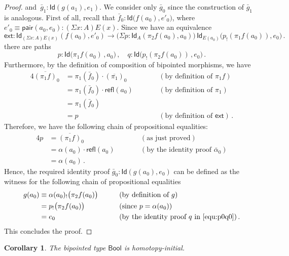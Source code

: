 \documentclass[reqno,10pt,a4paper,oneside]{amsart}
\numberwithin{equation}{section}
\theoremstyle{mythm}
\newtheorem{corollary}[theorem]{Corollary}
\theoremstyle{mydef}
\theoremstyle{myrmk}
\newcommand{\deq}{\equiv}
\newcommand{\peq}{=}
\newcommand{\co}{\colon}
\newcommand{\ext}{\mathsf{ext}}
\newcommand{\ct}{\cdot}
\newcommand{\pair}{\mathsf{pair}}
\newcommand{\Id}{\mathsf{Id}}
\newcommand{\refl}{\mathsf{refl}}
\newcommand{\Bool}{\mathsf{Bool}}
\begin{document}
\begin{proof}
and~$\bar{g}_1 \co \Id( g(a_1), e_1)$. We consider only $\bar{g}_0$ since the construction of $\bar{g}_1$ is  analogous. First of all, recall that 
$\bar{f}_0 \co \Id \big( f(a_0),  e'_0\big)$, where $e'_0 \equiv \pair(a_0, e_0) \co (\Sigma x :A ) E(x)$. Since we have an equivalence
\[
\ext \co \Id_{(\Sigma x : A) E(x)}( f(a_0), e'_0) \to \big( \Sigma p \co \Id_A( \pi_2 f(a_0), a_0) \big) \, \Id_{E(a_0)} \big( p_{!}( \pi_1 f(a_0)) , e_0 \big) \, .
\]
there are paths 
\begin{equation}
\label{equ:p0q0}
p \co \Id \big( \pi_1 f (a_0) \, , a_0 \big) \, , \quad q \co \Id \big( p_{!}( \pi_2 f (a_0)) \, , e_0 \big)  \, .
\end{equation}
Furthermore, by the definition of composition of bipointed morphisms, we have
\begin{alignat*}{4}  
\overline{(\pi_1 f)}_0  & = \pi_1(\bar{f}_0) \ct (\overline{\pi_1})_0 & & \qquad (\text{by definition of } \pi_1 f)   \\
& = \pi_1(\bar{f}_0) \ct \refl(a_0) & & \qquad (\text{by definition of } \pi_1)  \\
 & = \pi_1(\bar{f}_0) & & \qquad \\
 & = p  & & \qquad (\text{by definition of } \ext) \,  .
\end{alignat*}
Therefore, we have the following chain of propositional equalities:
\begin{alignat*}{4}
p & =  \overline{(\pi_1 f)}_0 & &  \qquad (\text{as just proved})  \\
  & =  \alpha(a_0) \ct \refl(a_0) & &  \qquad (\text{by the identity proof } \bar{\alpha}_0 ) \\ 
  & =  \alpha(a_0) \, .
\end{alignat*} 
Hence,  the required identity proof $\bar{g}_0 \co \Id( g(a_0), e_0)$ can be defined as the witness for the following chain of propositional equalities
\begin{alignat*}{4}
g(a_0) & \deq \alpha(a_0)_{!} \big( \pi_2 f(a_0)  \big) & & \qquad (\text{by definition of } g) \\
 &              \peq   p_{!} \big( \pi_2 f(a_0)  \big) & & \qquad (\text{since } p = \alpha(a_0)) \\
   &            \peq  e_0  & &  \qquad (\text{by the identity proof } q \text{ in } \eqref{equ:p0q0}) \, .
   \end{alignat*} 
   This concludes the proof.
\end{proof}


\begin{corollary}\label{lem:BoolInitInt}
The bipointed type $\Bool$ is homotopy-initial.
\end{corollary}
\end{document}
